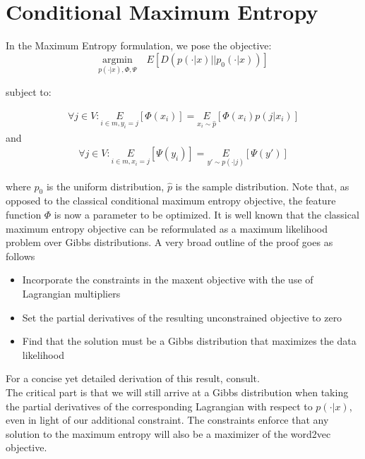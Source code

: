 \documentclass[]{article}
\begin{document}
\section{Conditional Maximum Entropy}

In the Maximum Entropy formulation, we pose the objective:\\

\begin{equation}\underset{p(\cdot | x), \Phi, \Psi}{\text{argmin}} \quad E\left[ D(p(\cdot|x) \vert \vert  p_0(\cdot|x))\right] \label{eq:maxent}
\end{equation}

\noindent subject to:

\begin{align}
	\forall j \in V: \underset{i \in m, y_i = j}{E}\left[\Phi(x_i)\right] = \underset{x_i \sim \hat{p}}{E}\left[\Phi(x_i) p(j|x_i)\right]
\end{align}
\noindent and
\begin{align}
	\forall j \in V: \underset{i \in m, x_i = j}{E}\left[\Psi(y_i)\right] = \underset{y\prime \sim p(\cdot|j)}{E}\left[\Psi(y\prime)\right]
\end{align}

\noindent where $p_0$ is the uniform distribution, $\hat{p}$ is the sample distribution. Note that, as opposed to the classical conditional maximum entropy objective, the feature function $\Phi$ is now a parameter to be optimized. It is well known that the classical maximum entropy objective can be reformulated as a maximum likelihood problem over Gibbs distributions. A very broad outline of the proof goes as follows
\begin{itemize}
\item Incorporate the constraints in the maxent objective with the use of Lagrangian multipliers
\item Set the partial derivatives of the resulting unconstrained objective to zero
\item Find that the solution must be a Gibbs distribution that maximizes the data likelihood  
\end{itemize}
For a concise yet detailed derivation of this result, consult\cite{logregmaxent}.\\

The critical part is that we will still arrive at a Gibbs distribution when taking the partial derivatives of the corresponding Lagrangian with respect to $p(\cdot|x)$, even in light of our additional constraint. The constraints enforce that any solution to the maximum entropy will also be a maximizer of the word2vec objective.
\end{document}
